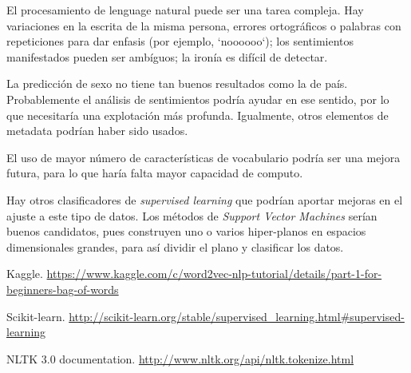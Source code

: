 \documentclass[11pt,a4paper]{article}
\begin{document}
  El procesamiento de lenguage natural puede ser una tarea compleja. Hay variaciones en la escrita de la misma persona, errores ortogr\'aficos o palabras con repeticiones para dar enfasis (por ejemplo, `noooooo`); los sentimientos manifestados pueden ser amb\'iguos; la iron\'ia es dif\'icil de detectar. 

  La predicci\'on de sexo no tiene tan buenos resultados como la de pa\'is. Probablemente el an\'alisis de sentimientos podr\'ia ayudar en ese sentido, por lo que necesitar\'ia una explotaci\'on m\'as profunda. Igualmente, otros elementos de metadata podr\'ian haber sido usados.

  El uso de mayor n\'umero de caracter\'isticas de vocabulario podr\'ia ser una mejora futura, para lo que har\'ia falta mayor capacidad de computo.

  Hay otros clasificadores de {\em supervised learning} que podr\'ian aportar mejoras en el ajuste a este tipo de datos. Los m\'etodos de {\em Support Vector Machines} ser\'ian buenos candidatos, pues construyen uno o varios hiper-planos en espacios dimensionales grandes, para as\'i dividir el plano y clasificar los datos. 

\begin{thebibliography}{}

\bibitem{} Kaggle.
\newblock \url{https://www.kaggle.com/c/word2vec-nlp-tutorial/details/part-1-for-beginners-bag-of-words}

\bibitem{} Scikit-learn.
\newblock \url{http://scikit-learn.org/stable/supervised_learning.html#supervised-learning}

\bibitem{} NLTK 3.0 documentation.
\newblock \url{http://www.nltk.org/api/nltk.tokenize.html}


\end{thebibliography}
\end{document}

